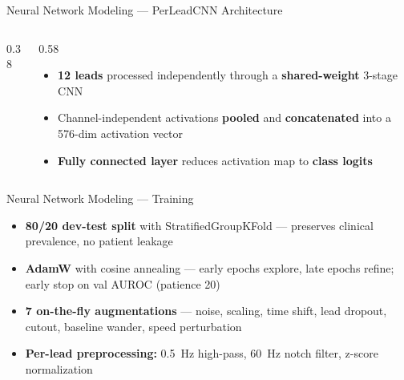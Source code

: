\documentclass[10pt,aspectratio=169]{beamer}
\begin{document}
\begin{frame}{Neural Network Modeling --- PerLeadCNN Architecture}
\begin{columns}[T]
\begin{column}{0.38\textwidth}
    \end{column}

    \begin{column}{0.58\textwidth}
      \vspace{0.5em}
      \begin{large}
      \begin{itemize}
        \setlength{\itemsep}{1.8em}

        \item \textbf{12 leads} processed independently through a \textbf{shared-weight} 3-stage CNN

        \item Channel-independent activations \textbf{pooled} and \textbf{concatenated} into a 576-dim activation vector

        \item \textbf{Fully connected layer} reduces activation map to \textbf{class logits}

      \end{itemize}
      \end{large}
    \end{column}

  \end{columns}
\end{frame}

\begin{frame}{Neural Network Modeling --- Training}

  \begin{large}
  \begin{itemize}
    \setlength{\itemsep}{1.0em}

    \item \textbf{80/20 dev-test split} with StratifiedGroupKFold --- preserves clinical prevalence, no patient leakage

    \item \textbf{AdamW} with cosine annealing --- early epochs explore, late epochs refine; early stop on val AUROC (patience 20)

    \item \textbf{7 on-the-fly augmentations} --- noise, scaling, time shift, lead dropout, cutout, baseline wander, speed perturbation

    \item \textbf{Per-lead preprocessing:} 0.5~Hz high-pass, 60~Hz notch filter, z-score normalization

  \end{itemize}
  \end{large}

\end{frame}
\end{document}
